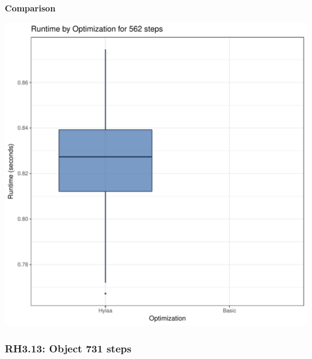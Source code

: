 \documentclass{article}\usepackage[]{graphicx}\usepackage[]{color}
\makeatletter
\def\maxwidth{ %
  \ifdim\Gin@nat@width>\linewidth
    \linewidth
  \else
    \Gin@nat@width
  \fi
}
\newenvironment{knitrout}{}{} %
\makeatother
\begin{document}
 \textbf{Comparison}
  
\begin{knitrout}
\color{fgcolor}
\includegraphics[width=\maxwidth]{figure/RH3_steps562-1} 

\end{knitrout}


\subsubsection{RH3.13: Object 731 steps}
\end{document}
